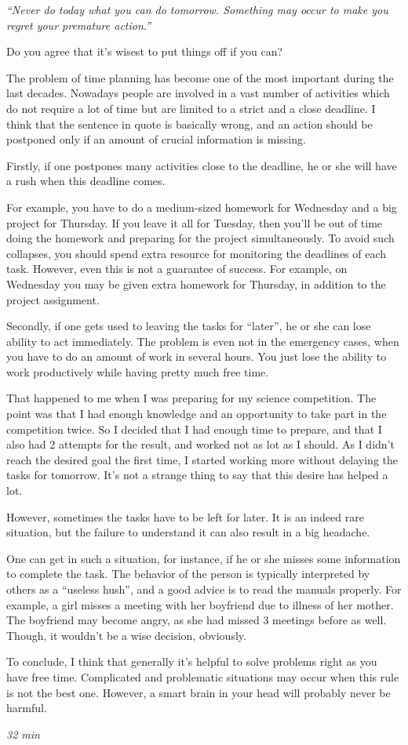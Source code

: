 \documentclass[12pt,a4paper]{article}
\begin{document}
\textit{``Never do today what you can do tomorrow. Something may occur to make you regret your premature action.''}

Do you agree that it's wisest to put things off if you can?

\vspace{3mm}
\hline
\vspace{5mm}

The problem of time planning has become one of the most important during the last decades. Nowadays people are involved in a vast number of activities which do not require a lot of time but are limited to a strict and a close deadline. I think that the sentence in quote is basically wrong, and an action should be postponed only if an amount of crucial information is missing.

Firstly, if one postpones many activities close to the deadline, he or she will have a rush when this deadline comes.

For example, you have to do a medium-sized homework for Wednesday and a big project for Thursday. If you leave it all for Tuesday, then you'll be out of time doing the homework and preparing for the project simultaneously. To avoid such collapses, you should spend extra resource for monitoring the deadlines of each task. However, even this is not a guarantee of success. For example, on Wednesday you may be given extra homework for Thursday, in addition to the project assignment.

Secondly, if one gets used to leaving the tasks for ``later'', he or she can lose ability to act immediately. The problem is even not in the emergency cases, when you have to do an amount of work in several hours. You just lose the ability to work productively while having pretty much free time. 

That happened to me when I was preparing for my science competition. The point was that I had enough knowledge and an opportunity to take part in the competition twice. So I decided that I had enough time to prepare, and that I also had 2 attempts for the result, and worked not as lot as I should. As I didn't reach the desired goal the first time, I started working more without delaying the tasks for tomorrow. It's not a strange thing to say that this desire has helped a lot.

However, sometimes the tasks have to be left for later. It is an indeed rare situation, but the failure to understand it can also result in a big headache.

One can get in such a situation, for instance, if he or she misses some information to complete the task. The behavior of the person is typically interpreted by others as a ``useless hush'', and a good advice is to read the manuals properly. For example, a girl misses a meeting with her boyfriend due to illness of her mother. The boyfriend may become angry, as she had missed 3 meetings before as well. Though, it wouldn't be a wise decision, obviously.

To conclude, I think that generally it's helpful to solve problems right as you have free time. Complicated and problematic situations may occur when this rule is not the best one. However, a smart brain in your head will probably never be harmful.

\textit{32 min}
\end{document}
